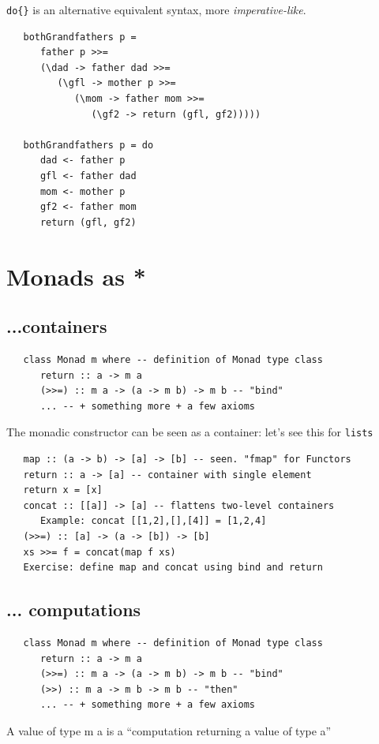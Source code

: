 \lstinline|do{}| is an alternative equivalent syntax,
more \textit{imperative-like}.
\begin{lstlisting}
   bothGrandfathers p =
      father p >>= 
      (\dad -> father dad >>= 
         (\gfl -> mother p >>= 
            (\mom -> father mom >>= 
               (\gf2 -> return (gfl, gf2)))))
   
   bothGrandfathers p = do
      dad <- father p
      gfl <- father dad
      mom <- mother p
      gf2 <- father mom
      return (gfl, gf2)
\end{lstlisting}

\section{Monads as *}
\subsection{...containers}
\begin{lstlisting}
   class Monad m where -- definition of Monad type class
      return :: a -> m a
      (>>=) :: m a -> (a -> m b) -> m b -- "bind"
      ... -- + something more + a few axioms
\end{lstlisting}

The monadic constructor can be seen as a container:
let’s see this for \lstinline|lists|

\begin{lstlisting}
   map :: (a -> b) -> [a] -> [b] -- seen. "fmap" for Functors
   return :: a -> [a] -- container with single element
   return x = [x]
   concat :: [[a]] -> [a] -- flattens two-level containers
      Example: concat [[1,2],[],[4]] = [1,2,4]
   (>>=) :: [a] -> (a -> [b]) -> [b]
   xs >>= f = concat(map f xs)
   Exercise: define map and concat using bind and return
\end{lstlisting}

\subsection{... computations}

\begin{lstlisting}
   class Monad m where -- definition of Monad type class
      return :: a -> m a
      (>>=) :: m a -> (a -> m b) -> m b -- "bind"
      (>>) :: m a -> m b -> m b -- "then"
      ... -- + something more + a few axioms
\end{lstlisting}
A value of type m a is a “computation returning a value of type a”

